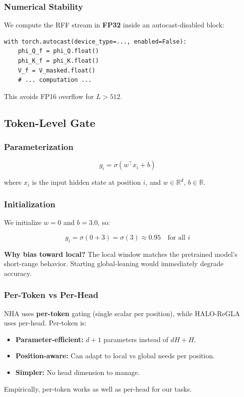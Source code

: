 \subsubsection{Numerical Stability}

We compute the RFF stream in \textbf{FP32} inside an autocast-disabled block:

\begin{lstlisting}
with torch.autocast(device_type=..., enabled=False):
    phi_Q_f = phi_Q.float()
    phi_K_f = phi_K.float()
    V_f = V_masked.float()
    # ... computation ...
\end{lstlisting}

This avoids FP16 overflow for $L > 512$.

\subsection{Token-Level Gate}

\subsubsection{Parameterization}

\[
g_i = \sigma(w^\top x_i + b)
\tag{4.11}
\]

where $x_i$ is the input hidden state at position $i$, and $w \in \mathbb{R}^d$, 
$b \in \mathbb{R}$.

\subsubsection{Initialization}

We initialize $w = 0$ and $b = 3.0$, so:

\[
g_i = \sigma(0 + 3) = \sigma(3) \approx 0.95 \quad \text{for all } i
\tag{4.12}
\]

\textbf{Why bias toward local?} The local window matches the pretrained model's 
short-range behavior. Starting global-leaning would immediately degrade 
accuracy.

\subsubsection{Per-Token vs Per-Head}

NHA uses \textbf{per-token} gating (single scalar per position), while HALO-ReGLA 
uses per-head. Per-token is:

\begin{itemize}
\item \textbf{Parameter-efficient:} $d + 1$ parameters instead of $d H + H$.
\item \textbf{Position-aware:} Can adapt to local vs global needs per position.
\item \textbf{Simpler:} No head dimension to manage.

\end{itemize}
Empirically, per-token works as well as per-head for our tasks.

